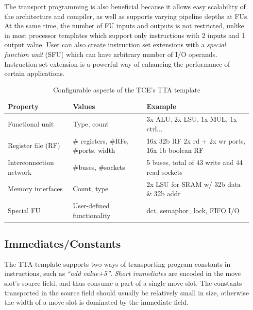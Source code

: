 \documentclass[a4paper,twoside]{tceusermanual}
\begin{document}
The transport programming is also beneficial because it allows easy
scalability of the architecture and compiler, as well as supports
varying pipeline depths at FUs. At the same time, the number of FU
inputs and outputs is not restricted, unlike in most processor
templates which support only instructions with 2 inputs and 1
output value. User can also create instruction set extensions with a
\textit{special function unit} (SFU) which can have arbitrary number
of I/O operands. Instruction set extension is a powerful way of
enhancing the performance of certain applications.

\begin{table}
  \begin{center}
    \caption {Configurable aspects of the TCE's TTA template}
    \label {tab:filetypes}
    \begin{tabular}{l | l | l }
      \hline
      Property & Values & Example  \\
      \hline
      \hline
      Functional unit         & Type, count                         & 3x ALU, 2x LSU, 1x MUL, 1x ctrl...\\
      Register file (RF)      & \# registers, \#RFs, \#ports, width & 16x 32b RF 2x rd + 2x wr ports, 16x 1b boolean RF \\
      Interconnection network & \#buses, \#sockets                & 5 buses, total of 43 write and 44 read sockets\\
      Memory interfaces       & Count, type                       & 2x LSU for SRAM w/ 32b data \& 32b addr \\
      Special FU              & User-defined functionality        & dct, semaphor\_lock, FIFO I/O \\
      \hline
    \end{tabular}
  \end{center}
\end{table}

\subsection{Immediates/Constants}

The TTA template supports two ways of transporting program constants
in instructions, such as \textit{``add value+5''}. \textit{Short
  immediates} are encoded in the move slot's source field, and thus
consume a part of a single move slot. The constants transported in the
source field should usually be relatively small in size, otherwise the
width of a move slot is dominated by the immediate field.
\end{document}
